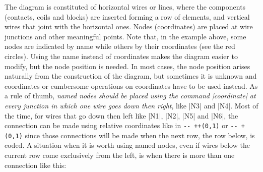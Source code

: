 \documentclass[a4paper]{ltxdoc}
\begin{document}
\noindent{}The diagram is constituted of horizontal wires or lines, where the components (contacts, coils and blocks) are inserted forming a row of elements, and vertical wires that joint with the horizontal ones. Nodes (coordinates) are placed at wire junctions and other meaningful points. Note that, in the example above, some nodes are indicated by name while others by their coordinates (see the red circles). Using the name instead of coordinates makes the diagram easier to modify, but the node position is needed. In most cases, the node position arises naturally from the construction of the diagram, but sometimes it is unknown and coordinates or cumbersome operations on coordinates have to be used instead. As a rule of thumb, \emph{named nodes should be placed using the command |coordinate| at every junction in which one wire goes down then right}, like |N3| and |N4|. Most of the time, for wires that go down then left like |N1|, |N2|, |N5| and |N6|, the connection can be made using relative coordinates like in \verb!-- ++(0,1)! or \verb!-- +(0,1)! since those connections will be made when the next row, the row below, is coded. A situation when it is worth using named nodes, even if wires below the current row come exclusively from the left, is when there is more than one connection like this:

\begin{center}
\end{center}
\end{document}

